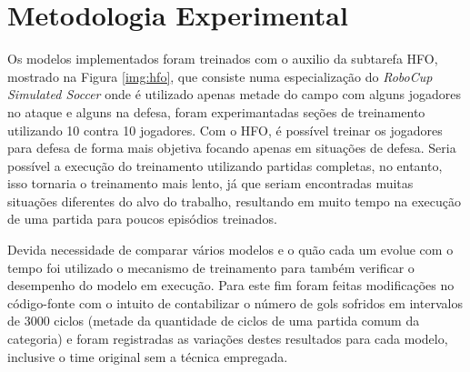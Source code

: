 \section{Metodologia Experimental}\label{meotodologia}

Os modelos implementados foram treinados com o auxilio da subtarefa HFO,
mostrado na Figura \ref{img:hfo}, que consiste numa especialização do
\textit{RoboCup Simulated Soccer} onde é utilizado apenas metade do campo com
alguns jogadores no ataque e alguns na defesa, foram experimantadas seções de
treinamento utilizando 10 contra 10 jogadores. Com o HFO, é
possível treinar os jogadores para defesa de forma mais objetiva focando apenas
em situações de defesa. Seria possível a execução do treinamento utilizando
partidas completas, no entanto, isso tornaria o treinamento mais lento, já que
seriam encontradas muitas situações diferentes do alvo do trabalho,
resultando em muito tempo na execução de uma partida para poucos episódios
treinados.


Devida necessidade de comparar vários modelos e o quão cada um evolue com o
tempo foi utilizado o mecanismo de treinamento para também verificar o
desempenho do modelo em execução. Para este fim foram feitas modificações no
código-fonte com o intuito de contabilizar o número de gols sofridos em
intervalos de 3000 ciclos (metade da quantidade de ciclos de uma partida comum
da categoria) e foram registradas as variações destes resultados para cada
modelo, inclusive o time original sem a técnica empregada.